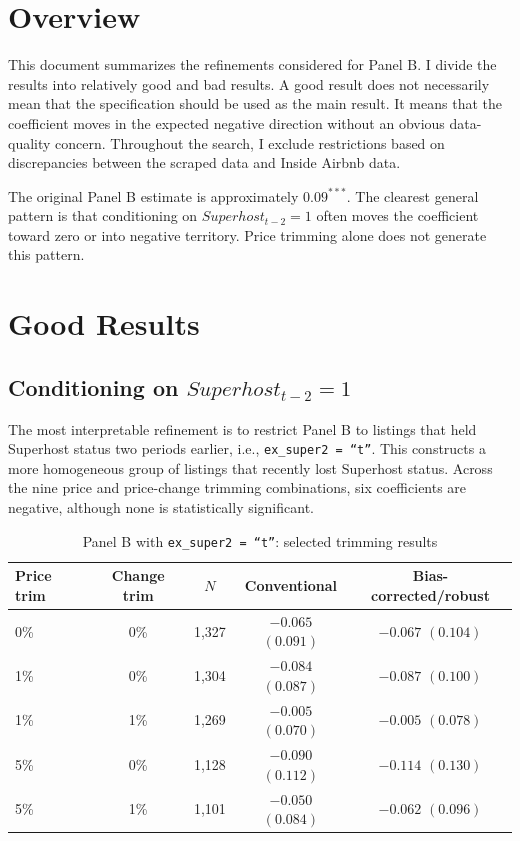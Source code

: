 \documentclass[12pt]{article}
\begin{document}
\section{Overview}

This document summarizes the refinements considered for Panel B. I divide the
results into relatively good and bad results. A good result does not
necessarily mean that the specification should be used as the main result. It
means that the coefficient moves in the expected negative direction without
an obvious data-quality concern. Throughout the search, I exclude restrictions
based on discrepancies between the scraped data and Inside Airbnb data.

The original Panel B estimate is approximately $0.09^{***}$. The clearest
general pattern is that conditioning on $Superhost_{t-2}=1$ often moves the
coefficient toward zero or into negative territory. Price trimming alone does
not generate this pattern.


\section{Good Results}

\subsection{Conditioning on $Superhost_{t-2}=1$}

The most interpretable refinement is to restrict Panel B to listings that held
Superhost status two periods earlier, i.e., \texttt{ex\_super2 = ``t''}. This
constructs a more homogeneous group of listings that recently lost Superhost
status. Across the nine price and price-change trimming combinations, six
coefficients are negative, although none is statistically significant.

\begin{table}[h]
\centering
\caption{Panel B with \texttt{ex\_super2 = ``t''}: selected trimming results}
\label{tab:exsuper2_trim}
\begin{tabular}{lcccc}
\hline
Price trim & Change trim & $N$ & Conventional & Bias-corrected/robust \\
\hline
0\% & 0\% & 1,327 & $-0.065$ $(0.091)$ & $-0.067$ $(0.104)$ \\
1\% & 0\% & 1,304 & $-0.084$ $(0.087)$ & $-0.087$ $(0.100)$ \\
1\% & 1\% & 1,269 & $-0.005$ $(0.070)$ & $-0.005$ $(0.078)$ \\
5\% & 0\% & 1,128 & $-0.090$ $(0.112)$ & $-0.114$ $(0.130)$ \\
5\% & 1\% & 1,101 & $-0.050$ $(0.084)$ & $-0.062$ $(0.096)$ \\
\hline
\end{tabular}
\end{table}
\end{document}
